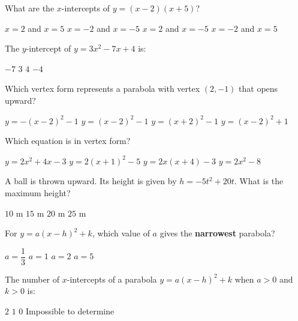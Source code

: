 \documentclass[addpoints]{exam}
\begin{document}
\begin{questions}
\question[1] What are the $x$-intercepts of $y = (x - 2)(x + 5)$?
\begin{choices}
    \choice $x = 2$ and $x = 5$
    \choice $x = -2$ and $x = -5$
    \correctchoice $x = 2$ and $x = -5$
    \choice $x = -2$ and $x = 5$
\end{choices}
\vspace{3mm}

\question[1] The $y$-intercept of $y = 3x^2 - 7x + 4$ is:
\begin{choices}
    \choice $-7$
    \choice $3$
    \correctchoice $4$
    \choice $-4$
\end{choices}
\vspace{3mm}

\question[1] Which vertex form represents a parabola with vertex $(2, -1)$ that opens upward?
\begin{choices}
    \choice $y = -(x - 2)^2 - 1$
    \correctchoice $y = (x - 2)^2 - 1$
    \choice $y = (x + 2)^2 - 1$
    \choice $y = (x - 2)^2 + 1$
\end{choices}
\vspace{3mm}

\question[1] Which equation is in vertex form?
\begin{choices}
    \choice $y = 2x^2 + 4x - 3$
    \correctchoice $y = 2(x + 1)^2 - 5$
    \choice $y = 2x(x + 4) - 3$
    \choice $y = 2x^2 - 8$
\end{choices}
\vspace{3mm}

\question[1] A ball is thrown upward. Its height is given by $h = -5t^2 + 20t$. What is the maximum height?
\begin{choices}
    \choice $10$ m
    \choice $15$ m
    \correctchoice $20$ m
    \choice $25$ m
\end{choices}
\vspace{3mm}

\question[1] For $y = a(x - h)^2 + k$, which value of $a$ gives the \textbf{narrowest} parabola?
\begin{choices}
    \choice $a = \dfrac{1}{3}$
    \choice $a = 1$
    \choice $a = 2$
    \correctchoice $a = 5$
\end{choices}
\vspace{3mm}

\question[1] The number of $x$-intercepts of a parabola $y = a(x-h)^2 + k$ when $a > 0$ and $k > 0$ is:
\begin{choices}
    \choice $2$
    \choice $1$
    \correctchoice $0$
    \choice Impossible to determine
\end{choices}
\vspace{3mm}


\end{questions}
\end{document}
